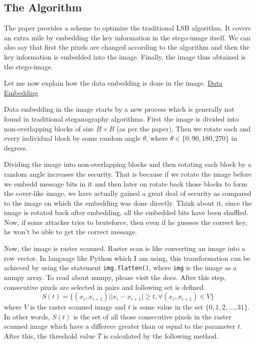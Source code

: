 \documentclass{report}
\begin{document}
\subsection{The Algorithm}
The paper provides a scheme to optimize the traditional LSB algorithm. It covers an extra mile by embedding the key information in the stego-image itself. We can also say that first the pixels are changed according to the algorithm and then the key information is embedded into the image. Finally, the image thus obtained is the stego-image. \par Let me now explain how the data embedding is done in the image.
\newpage
\underline{\large Data Embedding} \\
\par Data embedding in the image starts by a new process which is generally not found in traditional steganography algorithms. First the image is divided into non-overlapping blocks of size $B \times B$ (as per the paper). Then we rotate each and every individual block by some random angle $\theta$, where $\theta \in \{0, 90, 180, 270\}$ in degrees. \par Dividing the image into non-overlapping blocks and then rotating each block by a random angle increases the security. That is because if we rotate the image before we embedd message bits in it and then later on rotate back those blocks to form the cover-like image, we have actually gained a great deal of security as compared to the image on which the embedding was done directly. Think about it, since the image is rotated back after embedding, all the embedded bits have been shuffled. Now, if some attacker tries to bruteforce, then even if he guesses the correct key, he won't be able to get the correct message. \par Now, the image is raster scanned. Raster scan is like converting an image into a row vector. In language like Python which I am using, this transformation can be achieved by using the statement \texttt{img.flatten()}, where \texttt{img} is the image as a numpy array. To read about numpy, please visit the docs. After this step, consecutive pixels are selected in pairs and following set is defined.
\begin{equation}
S(t) = \{(x_{i}, x_{i+1})| |x_{i} - x_{i+1}| \geq t, \forall (x_{i}, x_{i+1}) \in V \}
\end{equation}
where $V$ is the raster scanned image and $t$ is some value in the set $\{0, 1, 2, ..., 31 \}$. In other words, $S(t)$ is the set of all those consecutive pixels in the raster scanned image which have a differece greater than or equal to the parameter $t$. After this, the threshold value $T$ is calculated by the following method.
\end{document}
